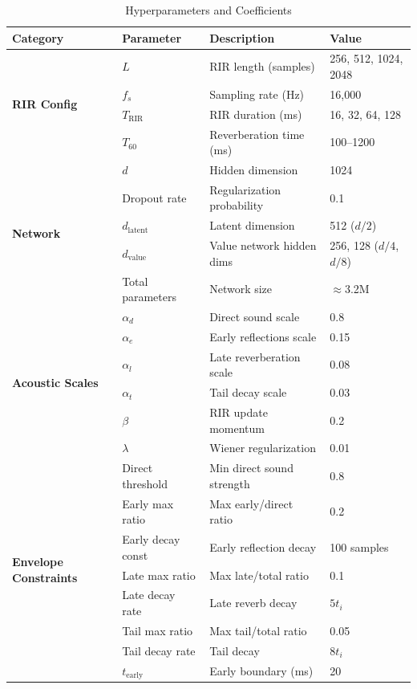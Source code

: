 \begin{table}[htbp]
\centering
\caption{Hyperparameters and Coefficients}
\label{tab:hyperparameters}
\small
\begin{tabular}{@{}llp{6cm}l@{}}
\toprule
\textbf{Category} & \textbf{Parameter} & \textbf{Description} & \textbf{Value} \\
\midrule
\multirow{4}{*}{\textbf{RIR Config}} 
& $L$ & RIR length (samples) & 256, 512, 1024, 2048 \\
& $f_s$ & Sampling rate (Hz) & 16,000 \\
& $T_{\text{RIR}}$ & RIR duration (ms) & 16, 32, 64, 128 \\
& $T_{60}$ & Reverberation time (ms) & 100--1200 \\
\midrule
\multirow{5}{*}{\textbf{Network}} 
& $d$ & Hidden dimension & 1024 \\
& Dropout rate & Regularization probability & 0.1 \\
& $d_{\text{latent}}$ & Latent dimension & 512 ($d/2$) \\
& $d_{\text{value}}$ & Value network hidden dims & 256, 128 ($d/4$, $d/8$) \\
& Total parameters & Network size & $\approx$3.2M \\
\midrule
\multirow{6}{*}{\textbf{Acoustic Scales}} 
& $\alpha_d$ & Direct sound scale & 0.8 \\
& $\alpha_e$ & Early reflections scale & 0.15 \\
& $\alpha_l$ & Late reverberation scale & 0.08 \\
& $\alpha_t$ & Tail decay scale & 0.03 \\
& $\beta$ & RIR update momentum & 0.2 \\
& $\lambda$ & Wiener regularization & 0.01 \\
\midrule
\multirow{8}{*}{\textbf{Envelope Constraints}} 
& Direct threshold & Min direct sound strength & 0.8 \\
& Early max ratio & Max early/direct ratio & 0.2 \\
& Early decay const & Early reflection decay & 100 samples \\
& Late max ratio & Max late/total ratio & 0.1 \\
& Late decay rate & Late reverb decay & $5t_i$ \\
& Tail max ratio & Max tail/total ratio & 0.05 \\
& Tail decay rate & Tail decay & $8t_i$ \\
& $t_{\text{early}}$ & Early boundary (ms) & 20 \\

\end{tabular}
\end{table}
